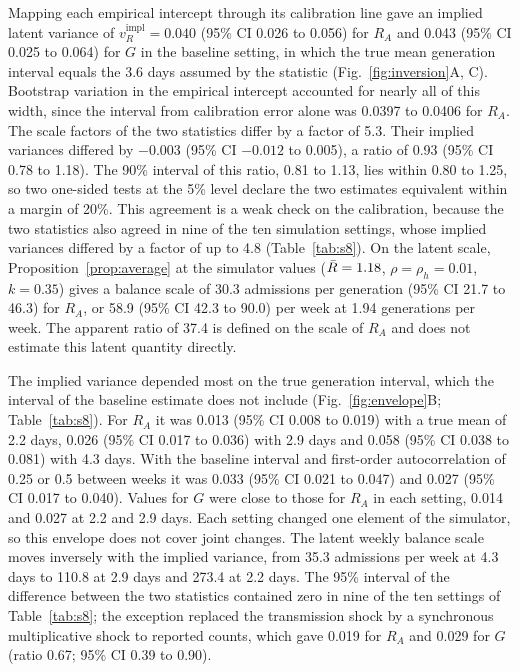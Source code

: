 Mapping each empirical intercept through its calibration line gave an implied latent variance of $v_R^{\mathrm{impl}}=0.040$ (95\% CI 0.026 to 0.056) for $R_A$ and 0.043 (95\% CI 0.025 to 0.064) for $G$ in the baseline setting, in which the true mean generation interval equals the 3.6 days assumed by the statistic (Fig.~\ref{fig:inversion}A, C). Bootstrap variation in the empirical intercept accounted for nearly all of this width, since the interval from calibration error alone was 0.0397 to 0.0406 for $R_A$. The scale factors of the two statistics differ by a factor of 5.3. Their implied variances differed by $-0.003$ (95\% CI $-0.012$ to 0.005), a ratio of 0.93 (95\% CI 0.78 to 1.18). The 90\% interval of this ratio, 0.81 to 1.13, lies within 0.80 to 1.25, so two one-sided tests at the 5\% level declare the two estimates equivalent within a margin of 20\%. This agreement is a weak check on the calibration, because the two statistics also agreed in nine of the ten simulation settings, whose implied variances differed by a factor of up to 4.8 (Table~\ref{tab:s8}). On the latent scale, Proposition~\ref{prop:average} at the simulator values ($\bar{R}=1.18$, $\rho=\rho_h=0.01$, $k=0.35$) gives a balance scale of 30.3 admissions per generation (95\% CI 21.7 to 46.3) for $R_A$, or 58.9 (95\% CI 42.3 to 90.0) per week at 1.94 generations per week. The apparent ratio of 37.4 is defined on the scale of $R_A$ and does not estimate this latent quantity directly.

The implied variance depended most on the true generation interval, which the interval of the baseline estimate does not include (Fig.~\ref{fig:envelope}B; Table~\ref{tab:s8}). For $R_A$ it was 0.013 (95\% CI 0.008 to 0.019) with a true mean of 2.2 days, 0.026 (95\% CI 0.017 to 0.036) with 2.9 days and 0.058 (95\% CI 0.038 to 0.081) with 4.3 days. With the baseline interval and first-order autocorrelation of 0.25 or 0.5 between weeks it was 0.033 (95\% CI 0.021 to 0.047) and 0.027 (95\% CI 0.017 to 0.040). Values for $G$ were close to those for $R_A$ in each setting, 0.014 and 0.027 at 2.2 and 2.9 days. Each setting changed one element of the simulator, so this envelope does not cover joint changes. The latent weekly balance scale moves inversely with the implied variance, from 35.3 admissions per week at 4.3 days to 110.8 at 2.9 days and 273.4 at 2.2 days. The 95\% interval of the difference between the two statistics contained zero in nine of the ten settings of Table~\ref{tab:s8}; the exception replaced the transmission shock by a synchronous multiplicative shock to reported counts, which gave 0.019 for $R_A$ and 0.029 for $G$ (ratio 0.67; 95\% CI 0.39 to 0.90).

